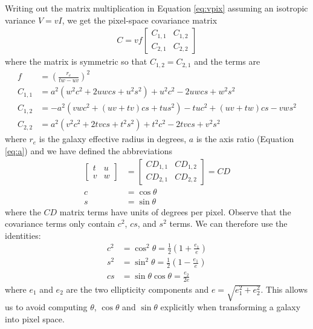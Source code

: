 \documentclass[11pt,preprint]{aastex}
\newcommand{\eqnref}[1]{Equation \ref{#1}}
\newcommand{\CD}{C\!D}
\begin{document}
Writing out the matrix multiplication in \eqnref{eq:vpix} assuming an
isotropic variance $V = v I$, we get the pixel-space covariance matrix
\begin{align}
C = v f \begin{bmatrix}
C_{1,1} & C_{1,2} \\
C_{2,1} & C_{2,2}
\end{bmatrix}
\end{align}
where the matrix is symmetric so that $C_{1,2} = C_{2,1}$ and the terms are
\begin{align}
f & = \left( \frac{r_e}{t w - u v} \right)^2
\\
C_{1,1} & =
%
a^2(w^2 c^2 + 2 u w c s + u^2 s^2) + u^2 c^2 - 2 u w c s + w^2 s^2
\\
C_{1,2} & =
%
-a^2 (v w c^2 + (u v + t v) c s + t u s^2) - t u c^2 + (u v + t w) c s - v w s^2
\\
C_{2,2} & =
%
a^2 (v^2 c^2 + 2 t v c s + t^2 s^2) + t^2 c^2 - 2 t v c s + v^2 s^2
\end{align}
where $r_e$ is the galaxy effective radius in degrees,
$a$ is the axis ratio (\eqnref{eq:a}) and
we have defined the abbreviations
\begin{align}
\begin{bmatrix}
t & u \\
v & w
\end{bmatrix}
& = 
\begin{bmatrix}
\CD_{1,1} & \CD_{1,2} \\
\CD_{2,1} & \CD_{2,2}
\end{bmatrix}
=
\CD
\\
c &= \cos \theta \\
s &= \sin \theta
\end{align}
where the $\CD$ matrix terms have units of degrees per pixel.
Observe that the covariance terms only contain $c^2$, $cs$, and $s^2$
terms.  We can therefore use the identities:
\begin{align}
c^2 & = \cos^2 \theta            =
\tfrac{1}{2} \left(1 + \frac{e_1}{e} \right) \\
s^2 & = \sin^2 \theta            =
\tfrac{1}{2} \left(1 - \frac{e_1}{e} \right) \\
cs  & = \sin \theta \cos \theta  = %
\frac{e_2}{2 e}
\end{align}
where $e_1$ and $e_2$ are the two ellipticity components and $e =
\sqrt{e_1^2 + e_2^2}$.  This allows us to avoid computing $\theta$,
$\cos \theta$ and $\sin \theta$ explicitly when transforming a galaxy
into pixel space.
\end{document}
